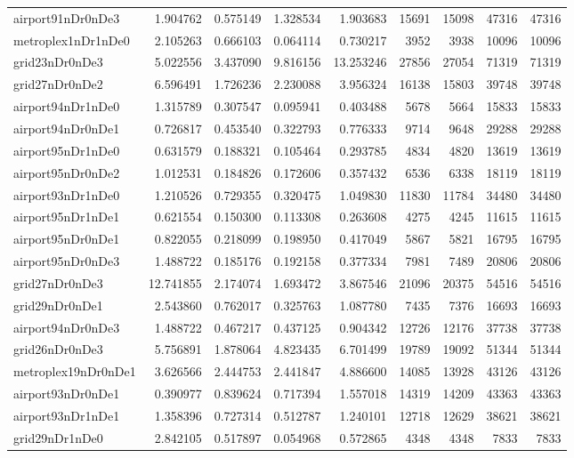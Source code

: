 \begin{longtable}{|l|r|r|r|r|r|r|r|r|}
airport91nDr0nDe3 & 1.904762 & 0.575149 & 1.328534 & 1.903683 & 15691 & 15098 & 47316 & 47316 \\
metroplex1nDr1nDe0 & 2.105263 & 0.666103 & 0.064114 & 0.730217 & 3952 & 3938 & 10096 & 10096 \\
grid23nDr0nDe3 & 5.022556 & 3.437090 & 9.816156 & 13.253246 & 27856 & 27054 & 71319 & 71319 \\
grid27nDr0nDe2 & 6.596491 & 1.726236 & 2.230088 & 3.956324 & 16138 & 15803 & 39748 & 39748 \\
airport94nDr1nDe0 & 1.315789 & 0.307547 & 0.095941 & 0.403488 & 5678 & 5664 & 15833 & 15833 \\
airport94nDr0nDe1 & 0.726817 & 0.453540 & 0.322793 & 0.776333 & 9714 & 9648 & 29288 & 29288 \\
airport95nDr1nDe0 & 0.631579 & 0.188321 & 0.105464 & 0.293785 & 4834 & 4820 & 13619 & 13619 \\
airport95nDr0nDe2 & 1.012531 & 0.184826 & 0.172606 & 0.357432 & 6536 & 6338 & 18119 & 18119 \\
airport93nDr1nDe0 & 1.210526 & 0.729355 & 0.320475 & 1.049830 & 11830 & 11784 & 34480 & 34480 \\
airport95nDr1nDe1 & 0.621554 & 0.150300 & 0.113308 & 0.263608 & 4275 & 4245 & 11615 & 11615 \\
airport95nDr0nDe1 & 0.822055 & 0.218099 & 0.198950 & 0.417049 & 5867 & 5821 & 16795 & 16795 \\
airport95nDr0nDe3 & 1.488722 & 0.185176 & 0.192158 & 0.377334 & 7981 & 7489 & 20806 & 20806 \\
grid27nDr0nDe3 & 12.741855 & 2.174074 & 1.693472 & 3.867546 & 21096 & 20375 & 54516 & 54516 \\
grid29nDr0nDe1 & 2.543860 & 0.762017 & 0.325763 & 1.087780 & 7435 & 7376 & 16693 & 16693 \\
airport94nDr0nDe3 & 1.488722 & 0.467217 & 0.437125 & 0.904342 & 12726 & 12176 & 37738 & 37738 \\
grid26nDr0nDe3 & 5.756891 & 1.878064 & 4.823435 & 6.701499 & 19789 & 19092 & 51344 & 51344 \\
metroplex19nDr0nDe1 & 3.626566 & 2.444753 & 2.441847 & 4.886600 & 14085 & 13928 & 43126 & 43126 \\
airport93nDr0nDe1 & 0.390977 & 0.839624 & 0.717394 & 1.557018 & 14319 & 14209 & 43363 & 43363 \\
airport93nDr1nDe1 & 1.358396 & 0.727314 & 0.512787 & 1.240101 & 12718 & 12629 & 38621 & 38621 \\
grid29nDr1nDe0 & 2.842105 & 0.517897 & 0.054968 & 0.572865 & 4348 & 4348 & 7833 & 7833 \\

\end{longtable}
